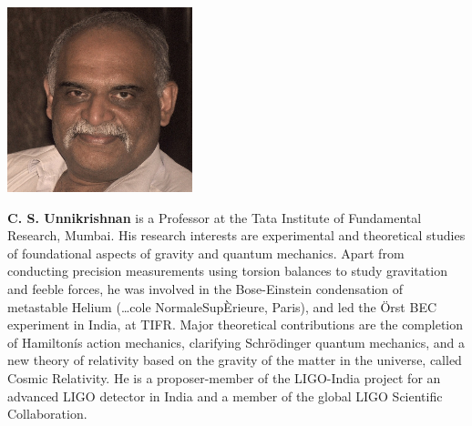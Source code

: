 \centerline{\includegraphics[scale=.7]{authorsphotos//C_S_Unnikrishnan.png}} 
\bigskip

\noindent
\textbf{C. S. Unnikrishnan} is a Professor at the Tata Institute of Fundamental Research, Mumbai. His research interests are experimental and theoretical studies of foundational aspects of gravity and quantum mechanics. Apart from conducting precision measurements using torsion balances to study gravitation and feeble forces, he was involved in the Bose-Einstein condensation of metastable Helium (…cole Normale\break Sup\`Erieure, Paris), and led the \"{O}rst BEC experiment in India, at TIFR. Major theoretical contributions are the completion of Hamiltonís action mechanics, clarifying Schr\"{o}dinger quantum mechanics, and a new theory of relativity based on the gravity of the matter in the universe, called Cosmic Relativity. He is a proposer-member of the LIGO-India project for an advanced LIGO detector in India and a member of the global LIGO Scientific Collaboration.

